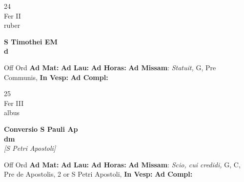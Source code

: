 \documentclass[10pt, openany]{book}
\begin{document}
        \begin{center}
            \begin{minipage}{3.5in}
                \vspace{2em}
                \begin{minipage}{0.5in}
                    {\Huge 24} \\
                    {\normalsize Fer II} \\
                    {\normalsize ruber}
                \end{minipage}
                \begin{minipage}{3.0in}
                    \textbf{ \large S Timothei EM \\
                    \textnormal{\normalsize d}} \\ 
                \end{minipage}
                \begin{justify}Off Ord
                    \textbf{Ad Mat: }
                    \textbf{Ad Lau: }
                    \textbf{Ad Horas: }\textbf{Ad Missam}: \textit{Statuit,} G, Pre Communis,  
                    \textbf{In Vesp: }
                    \textbf{Ad Compl: }
                \end{justify}
            \end{minipage}
        \end{center}
    
        \begin{center}
            \begin{minipage}{3.5in}
                \vspace{2em}
                \begin{minipage}{0.5in}
                    {\Huge 25} \\
                    {\normalsize Fer III} \\
                    {\normalsize albus}
                \end{minipage}
                \begin{minipage}{3.0in}
                    \textbf{ \large Conversio S Pauli Ap \\
                    \textnormal{\normalsize dm}} \\ \textit{[S Petri Apostoli]} \\ 
                \end{minipage}
                \begin{justify}Off Ord
                    \textbf{Ad Mat: }
                    \textbf{Ad Lau: }
                    \textbf{Ad Horas: }\textbf{Ad Missam}: \textit{Scio, cui credidi,} G, C, Pre de Apostolis, 2 or S Petri Apostoli,  
                    \textbf{In Vesp: }
                    \textbf{Ad Compl: }
                \end{justify}
            \end{minipage}
        \end{center}
    
\end{document}
